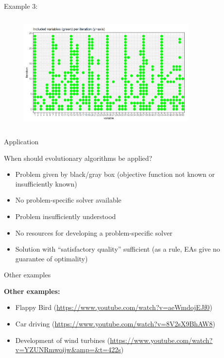 \documentclass[11pt,compress,t,notes=noshow, xcolor=table]{beamer}
\begin{document}
\begin{vbframe}{Example 3:}
\vspace{0.5cm}
\begin{center}
\begin{figure}
  \includegraphics[height = 6cm, width = 9cm]{figure_man/var-selection2.png}
\end{figure}
\end{center}

\end{vbframe}


\begin{vbframe}{Application}

When should evolutionary algorithms be applied?

\begin{itemize}
\item Problem given by black/gray box (objective function not known or insufficiently known)
\item No problem-specific solver available
\item Problem insufficiently understood
\item No resources for developing a problem-specific solver
\item Solution with \enquote{satisfactory quality} sufficient (as a rule, EAs give no guarantee of optimality)
\end{itemize}

\end{vbframe}

\begin{vbframe}{Other examples}

\textbf{Other examples:}

\begin{itemize}
\item Flappy Bird (\url{https://www.youtube.com/watch?v=aeWmdojEJf0})
\item Car driving (\url{https://www.youtube.com/watch?v=8V2sX9BhAW8})
\item Development of wind turbines (\url{https://www.youtube.com/watch?v=YZUNRmwoijw&amp=&t=422s})
\end{itemize}

\end{vbframe}
\end{document}
